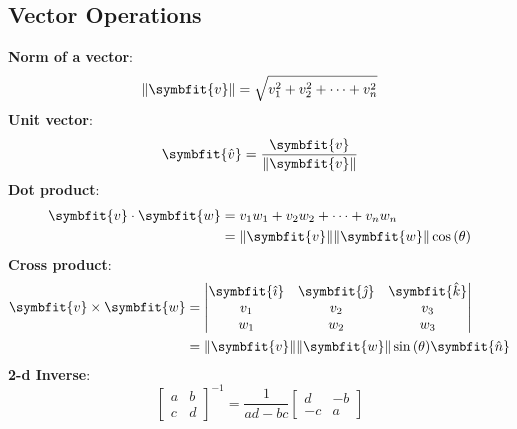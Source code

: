 \documentclass{article}
\begin{document}
\begin{multicols*}{2}
    \section*{Vector Operations}
    \textbf{Norm of a vector}:
    \begin{equation*}
        \norm{\symbfit{v}} = \sqrt{v_1^2 + v_2^2+\cdots+v_n^2}
    \end{equation*}
    \textbf{Unit vector}:
    \begin{equation*}
        \symbfit{\hat{v}} = \frac{\symbfit{v}}{\norm{\symbfit{v}}}
    \end{equation*}
    \textbf{Dot product}:
    \begin{align*}
        \symbfit{v}\cdot\symbfit{w} & = v_1 w_1 + v_2 w_2 + \cdots + v_n w_n                            \\
                                    & = \norm{\symbfit{v}} \norm{\symbfit{w}} \cos{\left(\theta\right)}
    \end{align*}
    \textbf{Cross product}:
    \begin{align*}
        \symbfit{v}\times\symbfit{w} & =
        \begin{vmatrix}
            \symbfit{\hat{\imath}} & \symbfit{\hat{\jmath}} & \symbfit{\hat{k}} \\
            v_1                    & v_2                    & v_3               \\
            w_1                    & w_2                    & w_3
        \end{vmatrix} \\
                                     & =
        \norm{\symbfit{v}}\norm{\symbfit{w}}\sin{\left(\theta\right)}\symbfit{\hat{n}}
    \end{align*}
    \textbf{2-d Inverse}:
    \begin{equation*}
        \begin{bmatrix}
            a & b \\ c & d
        \end{bmatrix}^{-1}
        = \frac{1}{ad - bc}
        \begin{bmatrix}
            d & -b \\ -c & a
        \end{bmatrix}
    \end{equation*}

\end{multicols*}
\end{document}
